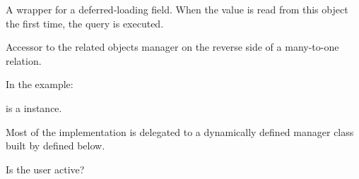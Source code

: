 \documentclass[letterpaper,10pt,english]{sphinxmanual}
\begin{document}
\begin{fulllineitems}
\begin{fulllineitems}
\end{fulllineitems}


\begin{fulllineitems}
\label{\detokenize{QuChemPedIA.models:QuChemPedIA.models.UserModel.Utilisateur.id}}
A wrapper for a deferred-loading field. When the value is read from this
object the first time, the query is executed.

\end{fulllineitems}


\begin{fulllineitems}
\label{\detokenize{QuChemPedIA.models:QuChemPedIA.models.UserModel.Utilisateur.importfile_set}}
Accessor to the related objects manager on the reverse side of a
many-to-one relation.

In the example:

%
\begin{sphinxVerbatim}[commandchars=\\\{\}]
 
       
\end{sphinxVerbatim}

 is a  instance.

Most of the implementation is delegated to a dynamically defined manager
class built by  defined below.

\end{fulllineitems}


\begin{fulllineitems}
\label{\detokenize{QuChemPedIA.models:QuChemPedIA.models.UserModel.Utilisateur.is_active}}
Is the user active?


\end{fulllineitems}
\end{fulllineitems}
\end{document}
